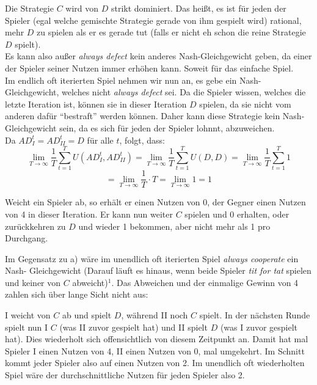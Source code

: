 \documentclass{scrartcl}
\newcommand{\exercise}[2]{\vspace{1em}\noindent{\bf Exercise #1 (#2)}}
\newcommand{\subexercise}[1]{\vspace{0.8em}\noindent{\bf #1)}}
\begin{document}
\hfill 
{\footnotesize }
\newline
{\footnotesize }

\noindent\hrulefill

\exercise{10.1}{Always-Defect and Tit-for-Tat}

\subexercise{a}
Die Strategie $C$ wird von $D$ strikt dominiert. Das heißt, es ist für jeden der Spieler (egal
welche gemischte Strategie gerade von ihm gespielt wird) rational, mehr $D$ zu spielen als er es gerade
tut (falls er nicht eh schon die reine Strategie $D$ spielt). \\

Es kann also außer \textsl{always defect} kein anderes Nash-Gleichgewicht geben, da einer der
Spieler seiner Nutzen immer erhöhen kann. Soweit für das einfache Spiel. \\

Im endlich oft iterierten Spiel nehmen wir nun an, es gebe ein Nash-Gleichgewicht, welches nicht
\textsl{always defect} sei. Da die Spieler wissen, welches die letzte Iteration ist, können sie
in dieser Iteration $D$ spielen, da sie nicht vom anderen dafür "`bestraft"' werden können. Daher
kann diese Strategie kein Nash-Gleichgewicht sein, da es sich für jeden der Spieler lohnnt,
abzuweichen. \\

\subexercise{b}
Da $AD^t_I = AD^t_{II} = D$ für alle $t$, folgt, dass:
\[
\lim_{T \to \infty} \frac{1}{T} \sum_{t=1}^{T} U(AD^t_I, AD^t_{II}) = \lim_{T \to \infty}
\frac{1}{T} \sum_{t=1}^{T} U(D, D) = \lim_{T \to \infty} \frac{1}{T} \sum_{t=1}^{T} 1
\]
\[
= \lim_{T \to \infty} \frac{1}{T} \cdot T = \lim_{T \to \infty} 1 = 1
\]

Weicht ein Spieler ab, so erhält er einen Nutzen von 0, der Gegner einen Nutzen von 4 in dieser
Iteration. Er kann nun weiter $C$ spielen und 0 erhalten, oder zurückkehren zu $D$ und wieder 1
bekommen, aber nicht mehr als 1 pro Durchgang. 

\subexercise{c}
Im Gegensatz zu a) wäre im unendlich oft iterierten Spiel \textsl{always cooperate} ein Nash-
Gleichgewicht (Darauf läuft es hinaus, wenn beide Spieler \textsl{tit for tat} spielen und keiner
von $C$ abweicht)$^1$. Das Abweichen und der einmalige Gewinn von 4 zahlen sich über lange Sicht
nicht aus:

I weicht von $C$ ab und spielt $D$, während II noch $C$ spielt. In der nächsten Runde spielt
nun I $C$ (was II zuvor gespielt hat) und II spielt $D$ (was I zuvor gespielt hat). Dies
wiederholt sich offensichtlich von diesem Zeitpunkt an. Damit hat mal Spieler I einen Nutzen von
4, II einen Nutzen von 0, mal umgekehrt. Im Schnitt kommt jeder Spieler also auf einen Nutzen
von 2. Im unendlich oft wiederholten Spiel wäre der durchschnittliche Nutzen für jeden Spieler
also 2. \\
\end{document}
